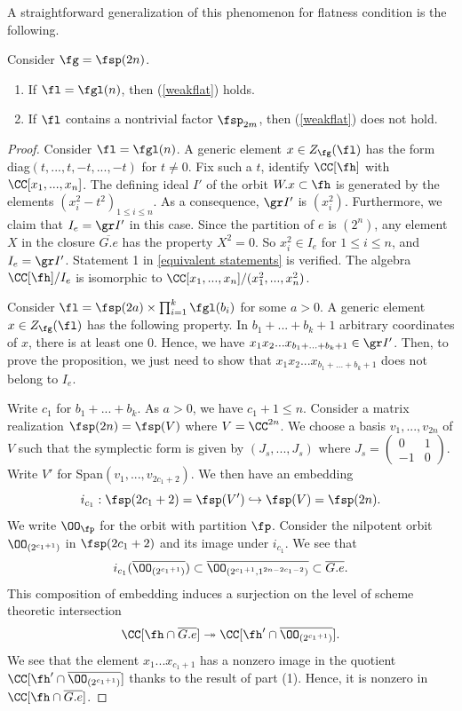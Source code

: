 \documentclass[12pt]{amsart}
\begin{document}
A straightforward generalization of this phenomenon for flatness condition is the following.
\begin{prop} \label{sp flatness}Consider $\fg= \fsp(2n)$. 
\begin{enumerate}
    \item If $\fl= \fgl(n)$, then (\ref{weakflat}) holds.
    \item If $\fl$ contains a nontrivial factor $\fsp_{2m}$, then (\ref{weakflat}) does not hold.
\end{enumerate}
\end{prop}
\begin{proof}
    Consider $\fl= \fgl(n)$. A generic element $x\in Z_\fg(\fl)$ has the form diag$(t,...,t,-t,...,-t)$ for $t\neq 0$. Fix such a $t$, identify $\CC[\fh]$ with $\CC[x_1,...,x_n]$. The defining ideal $I'$ of the orbit $W.x\subset \fh$ is generated by the elements $(x_i^2- t^2)_{1\leqslant i\leqslant n}$. As a consequence, $\gr I'$ is $(x_i^2)$. Furthermore, we claim that $I_e= \gr I'$ in this case. Since the partition of $e$ is $(2^{n})$, any element $X$ in the closure $\overline{G.e}$ has the property $X^2=0$. So $x_i^2\in I_e$ for $1\leqslant i\leqslant n$, and $I_e= \gr I'$. Statement 1 in \cref{equivalent statements} is verified. The algebra $\CC[\fh]/ I_e$ is isomorphic to $\CC[x_1,..., x_n]/(x_1^{2},..., x_n^{2})$.

    Consider $\fl= \fsp(2a)\times\prod_{i=1}^{k} \fgl(b_i)$ for some $a> 0$. A generic element $x\in Z_\fg(\fl)$ has the following property. In $b_1+...+b_k+ 1$ arbitrary coordinates of $x$, there is at least one $0$. Hence, we have $x_1x_2...x_{b_1+...+b_k+1}\in \gr I'$. Then, to prove the proposition, we just need to show that $x_1x_2...x_{b_1+...+b_k+1}$ does not belong to $I_e$. 
    
    Write $c_1$ for $b_1+...+b_k$. As $a>0$, we have $c_1+1\leqslant n$. Consider a matrix realization $\fsp({2n})= \fsp(V)$ where $V=\CC^{2n}$. We choose a basis $v_1,...,v_{2n}$ of $V$ such that the symplectic form is given by $(J_s,...,J_s)$ where $J_s= \begin{pmatrix}
0 & 1 \\
-1 & 0 
\end{pmatrix}$. Write $V'$ for Span$(v_1,...,v_{2c_1+2})$. We then have an embedding 
$$i_{c_1}: \fsp({2c_1+2})= \fsp(V')\hookrightarrow \fsp(V)= \fsp({2n}).$$
We write $\OO_\fp$ for the orbit with partition $\fp$. Consider the nilpotent orbit $\OO_{(2^{c_1+1})}$ in $\fsp({2c_1+2})$ and its image under $i_{c_1}$. We see that 
$$i_{c_1}(\overline{\OO_{(2^{c_1+1})}})\subset \overline{\OO_{(2^{c_1+1}, 1^{2n-2c_1-2})}}\subset \overline{G.e}.$$ 
This composition of embedding induces a surjection on the level of scheme theoretic intersection $$\CC[\fh\cap \overline{G.e}]\twoheadrightarrow \CC[\fh'\cap \overline{\OO_{(2^{c_1+1})}}].$$
We see that the element $x_1...x_{c_1+1}$ has a nonzero image in the quotient $\CC[\fh'\cap \overline{\OO_{(2^{c_1+1})}}]$ thanks to the result of part (1). Hence, it is nonzero in $\CC[\fh\cap \overline{G.e}]$. 
\end{proof}
\end{document}
